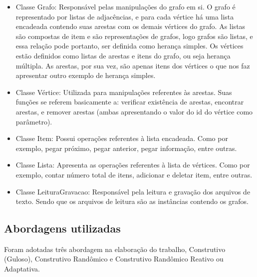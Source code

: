 \documentclass[12pt, fleqn]{article}
\begin{document}
	  \begin{itemize}
	      \item Classe Grafo: Responsável pelas manipulações do grafo em si. 
	      O grafo é representado por listas de adjacências, e para cada vértice há uma lista encadeada contendo suas arestas com os demais vértices do grafo. 
	      As listas são compostas de item e são representações de grafos, logo grafos são listas, e essa relação pode portanto, ser definida como herança simples. 
	      Os vértices estão definidos como listas de arestas e itens do grafo, ou seja herança múltipla. As arestas, por sua vez, são apenas itens dos vértices o que nos faz apresentar outro exemplo de herança simples. 
	      
	      \item Classe Vértice: Utilizada para manipulações referentes às arestas. Suas funções se referem basicamente a: verificar existência de arestas,
	      encontrar arestas, e remover arestas (ambas apresentando o valor do id do vértice como parâmetro).
	      
	      \item Classe Item: Possui operações referentes à lista encadeada. Como por exemplo, pegar próximo, pegar anterior, pegar informação, entre outras.
	      
	      \item Classe Lista: Apresenta as operações referentes à lista de vértices. Como por exemplo, contar número total de itens, adicionar e deletar item, entre outras.
	      
	      \item Classe LeituraGravacao: Responsável pela leitura e gravação dos arquivos de texto. Sendo que os arquivos de leitura são as instâncias contendo os grafos. 
	  \end{itemize}


      \subsection{Abordagens utilizadas}
	\quad Foram adotadas três abordagem na elaboração do trabalho,  Construtivo (Guloso), Construtivo Randômico e Construtivo Randômico Reativo ou Adaptativa.
	
\end{document}
